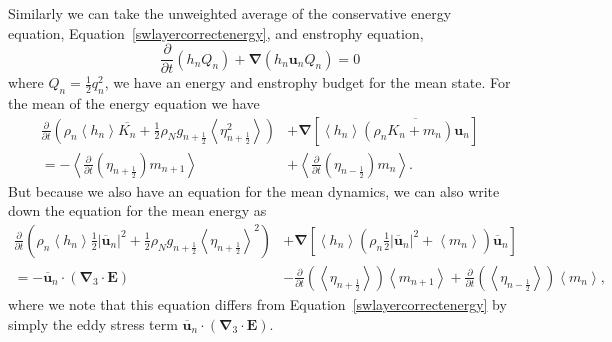 \documentclass[12pt,a4paper]{report}
\newcommand*\thkmean[1]{\overline{#1}}
\newcommand*\nthkmean[1]{\left\langle{#1}\right\rangle}
\newcommand*\equref[1]{Equation~\eqref{#1}}
\newcommand*{\half}{\frac{1}{2}}
\newcommand*{\partialdiff}[2][{}]{\frac{\partial #1}{\partial #2}}
\begin{document}
    Similarly we can take the unweighted average of the
    conservative energy equation, \equref{swlayercorrectenergy}, and 
    enstrophy equation, 
    \begin{equation*}
    \partialdiff{t}\left(h_{n}Q_{n}\right)+\boldsymbol{\nabla}\left(h_{n}\boldsymbol{u}_{n}Q_{n}\right) = 0
    \end{equation*}
    where $Q_{n} = \half q_{n}^{2}$, we have an energy and 
    enstrophy budget for the mean state. For the mean of the
    energy equation we have
    \begin{equation}
    \begin{split}
        \frac{\partial}{\partial t}\left(\rho_{n} \nthkmean{h_{n}} \thkmean{K_{n}}+ 
        \half \rho_{N} g_{n+\half }\nthkmean{\eta_{n+\half }^{2}} \right)
        &+\boldsymbol{\nabla} \left[\nthkmean{h_{n}} \thkmean{\left(\rho_{n}K_{n}+m_{n}\right) \boldsymbol{u}_{n}}\right] \\
        =- \nthkmean{\frac{\partial}{\partial t}\left(\eta_{n+\half }\right)   m_{n+1}}
        &+ \nthkmean{\frac{\partial}{\partial t}\left(\eta_{n-\half }\right) m_{n}}.
      \end{split}
                    \label{swtwameaneqenergy}
    \end{equation}
    But because we also have an equation for the mean dynamics, we
    can also write down the equation for the mean energy as
    \begin{equation}
        \begin{split}
        \frac{\partial}{\partial t}\left(\rho_{n} \nthkmean{h_{n}} \half \left|\thkmean{\boldsymbol{u}}_{n}\right|^{2}+ 
        \half \rho_{N} g_{n+\half }\nthkmean{\eta_{n+\half }}^{2} \right) &+\boldsymbol{\nabla} \left[\nthkmean{h_{n}} \left(\rho_{n}\half \left|\thkmean{\boldsymbol{u}}_{n}\right|^{2}+\nthkmean{m_{n}}\right) \thkmean{\boldsymbol{u}}_{n}\right] \\
        =-\thkmean{\boldsymbol{u}}_{n} \cdot \left(\boldsymbol{\nabla}_{3}\cdot \boldsymbol{E}\right)&- \frac{\partial}{\partial t}\left(\nthkmean{\eta_{n+\half }}\right)   \nthkmean{m_{n+1}}
        + \frac{\partial}{\partial t}\left(\nthkmean{\eta_{n-\half }}\right) \nthkmean{m_{n}},
              \end{split}
              \label{swtwaeqmeanenergy}
    \end{equation}
    where we note that this equation differs from \equref{swlayercorrectenergy} by simply the eddy stress
    term $\thkmean{\boldsymbol{u}}_{n} \cdot \left(\boldsymbol{\nabla}_{3}\cdot \boldsymbol{E}\right)$.
\end{document}
